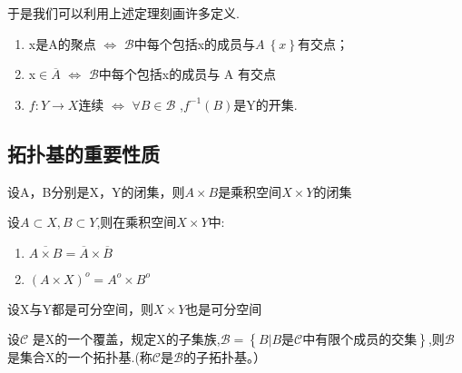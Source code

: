 于是我们可以利用上述定理刻画许多定义.
\begin{example}\begin{enumerate}
    \item x是A的聚点  \(\Leftrightarrow\) \(\mathscr{B}\)中每个包括x的成员与\(A \ \left\{x\right\}\)有交点； \\
   \item  x\(\in \overline{A}\) \(\Leftrightarrow\) \(\mathscr{B}\)中每个包括x的成员与 A 有交点\\
    \item \(f: Y \rightarrow X \)连续 \(\Leftrightarrow\) \(\forall B \in \mathscr{B} \) ,\(f^{-1}(B)\)是Y的开集.
    \end{enumerate}
\end{example}
\subsection*{拓扑基的重要性质}
\begin{theorem}
    设A，B分别是X，Y的闭集，则\(A \times B \)是乘积空间\(X \times Y\)的闭集
\end{theorem}
\begin{theorem}
    设\(A \subset X , B \subset Y \),则在乘积空间\(X \times Y\)中:
    \begin{enumerate}
        \item \(\overline{A \times B}= \overline{A} \times \overline{B}\) \\
        \item \((A \times X )^{o} = A^{o} \times B^{o}\)
    \end{enumerate}
\end{theorem}
\begin{theorem}
    设X与Y都是可分空间，则\(X \times Y \)也是可分空间
\end{theorem}
\begin{theorem}
    设\(\mathscr{C}\) 是X的一个覆盖，规定X的子集族,\(\mathscr{B} = \left\{B | B是 \mathscr{C}\text{中有限个成员的交集}\right\}\),则\(\mathscr{B}\)是集合X的一个拓扑基.(称\(\mathscr{C}\)是\(\mathscr{B}\)的子拓扑基。）
\end{theorem}





